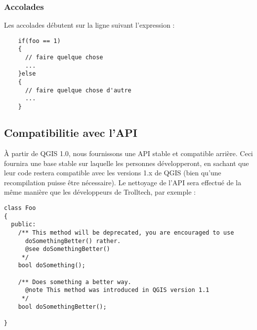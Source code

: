 \subsubsection{Accolades}
Les accolades débutent sur la ligne suivant l'expression :

\begin{verbatim}
	if(foo == 1)
	{
	  // faire quelque chose
	  ...
 	}else
	{
	  // faire quelque chose d'autre
	  ...
	}
\end{verbatim}

\subsection{Compatibilitie avec l'API}
À partir de QGIS 1.0, nous fournissons une API stable et compatible arrière. Ceci fournira une base stable sur laquelle les personnes développeront, en sachant que leur code restera compatible avec les versions 1.x de QGIS (bien qu’une recompilation puisse être nécessaire). Le nettoyage de l'API sera effectué de la même manière que les développeurs de Trolltech, par exemple :

\begin{verbatim}
class Foo 
{
  public:
    /** This method will be deprecated, you are encouraged to use 
      doSomethingBetter() rather.
      @see doSomethingBetter()
     */
    bool doSomething();

    /** Does something a better way.
      @note This method was introduced in QGIS version 1.1
     */
    bool doSomethingBetter();

}
\end{verbatim}

